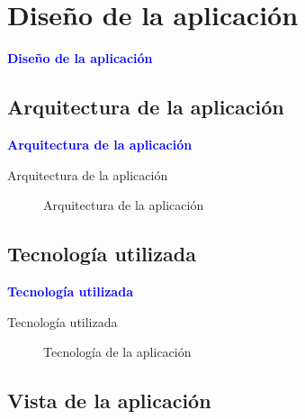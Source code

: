 \documentclass[10pt,hyperref={unicode}]{beamer}
\begin{document}
	\section{Diseño de la aplicación}
	
	\begin{frame}
		\begin{center}
			\Huge\textbf{\textsf{\textcolor{blue}{Diseño de la aplicación}}}
		\end{center}
	\end{frame}
	
	\subsection*{Arquitectura de la aplicación}
	
	\begin{frame}
		\begin{center}
			\Huge\textbf{\textsf{\textcolor{blue}{Arquitectura de la aplicación}}}
		\end{center}
	\end{frame}
	
	\begin{frame}{Arquitectura de la aplicación}
		\begin{figure}
			\centering
			\resizebox{!}{0.7\textheight}{\arquitectura}
			\caption{Arquitectura de la aplicación}
			\label{fig:arquitectura}
		\end{figure}
	\end{frame}
	
	\subsection*{Tecnología utilizada}
	
	\begin{frame}
		\begin{center}
			\Huge\textbf{\textsf{\textcolor{blue}{Tecnología utilizada}}}
		\end{center}
	\end{frame}
	
	\begin{frame}{Tecnología utilizada}
		\begin{figure}
			\centering
			\resizebox{!}{0.7\textheight}{\tecnologia}
			\caption{Tecnología de la aplicación}
			\label{fig:tecnologia}
		\end{figure}
	\end{frame}
	
	\subsection*{Vista de la aplicación}
	
\end{document}
